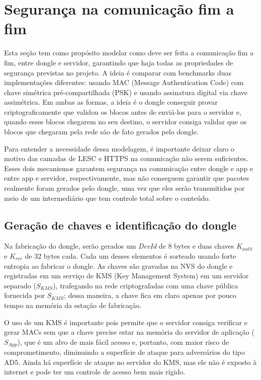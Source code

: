 \documentclass[
	12pt,
	article,			%
	oneside,
	a4paper,
	english,
	brazil				%
	]{abntex2}
\begin{document}
\section{Segurança na comunicação fim a fim}

Esta seção tem como propósito modelar como deve ser feita a comunicação fim a fim, entre dongle e servidor, garantindo que haja todas as propriedades de segurança previstas
no projeto. A ideia é comparar com benchmarks duas implementações diferentes: usando MAC (Message Authentication Code) com chave simétrica pré-compartilhada (PSK) e usando 
assinatura digital via chave assimétrica. Em ambas as formas, a ideia é o dongle conseguir provar criptograficamente que validou os blocos antes de enviá-los para o servidor e,
quando esses blocos chegarem no seu destino, o servidor consiga validar que os blocos que chegaram pela rede são de fato gerados pelo dongle. 

Para entender a necessidade dessa modelagem, é importante deixar claro o motivo das camadas de LESC e HTTPS na comunicação não serem suficientes. Esses dois mecanismos garantem
segurança na comunicação entre dongle e app e entre app e servidor, respectivamente, mas não conseguem garantir que pacotes realmente foram gerados pelo dongle, uma vez que eles
serão transmitidos por meio de um intermediário que tem controle total sobre o conteúdo.

\subsection{Geração de chaves e identificação do dongle}

Na fabricação do dongle, serão gerados um \textit{DevId} de 8 bytes e duas chaves $K_{auth}$ e $K_{rec}$ de 32 bytes cada. Cada um desses elementos é sorteado usando forte
entropia ao fabricar o dongle. As chaves são gravadas na NVS do dongle e registradas em um serviço de KMS (Key Management System) em um servidor separado ($S_{KMS}$), 
trafegando na rede criptografadas com uma chave pública fornecida por $S_{KMS}$; dessa maneira, a chave fica em claro apenas por pouco tempo na memória da estação
de fabricação.

O uso de um KMS é importante pois permite que o servidor consiga verificar e gerar MACs sem que a chave precise estar na memória do servidor de aplicação ($S_{App}$), que
é um alvo de mais fácil acesso e, portanto, com maior risco de comprometimento, diminuindo a superfície de ataque para adversários do tipo AD5. Ainda há superfície de ataque
no servidor do KMS, mas ele não é exposto à internet e pode ter um controle de acesso bem mais rígido. 
\end{document}
